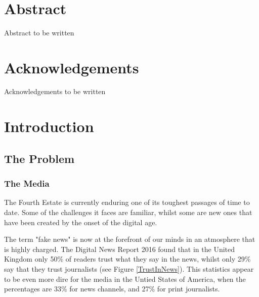 \documentclass[12pt]{article}
\makeatletter
\let\thedate\@date
\makeatother
\begin{document}
\begin{titlepage}
	{\large \thedate}\\[2 cm]
 
	\vfill
	
\end{titlepage}


\section*{Abstract}
Abstract to be written

\pagebreak

\section*{Acknowledgements}

Acknowledgements to be written

\clearpage

\doublespacing
\tableofcontents
\pagebreak
\listoffigures
\listoftables
\singlespacing
\pagebreak



\section{Introduction}

\subsection{The Problem}

\subsubsection{The Media}

The Fourth Estate is currently enduring one of its toughest passages of time to date. Some of the challenges it faces are familiar, whilst some are new ones that have been created by the onset of the digital age. 

The term "fake news" is now at the forefront of our minds in an atmosphere that is highly charged. The Digital News Report 2016 found that in the United Kingdom only 50\% of readers trust what they say in the news, whilst only 29\% say that they trust journalists (see Figure \ref{TrustInNews}). This statistics appear to be even more dire for the media in the Untied States of America, when the percentages are 33\% for news channels, and 27\% for print journalists.
\end{document}
